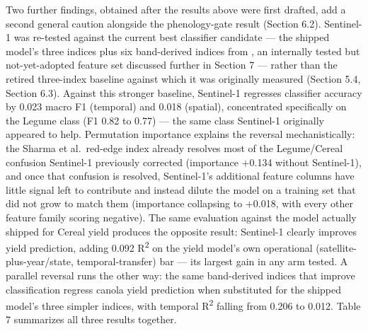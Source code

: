 Two further findings, obtained after the results above were first drafted, add a second general caution alongside the phenology-gate result (Section 6.2). Sentinel-1 was re-tested against the current best classifier candidate --- the shipped model's three indices plus six band-derived indices from \citet{sharma2026wa}, an internally tested but not-yet-adopted feature set discussed further in Section 7 --- rather than the retired three-index baseline against which it was originally measured (Section 5.4, Section 6.3). Against this stronger baseline, Sentinel-1 regresses classifier accuracy by 0.023 macro F1 (temporal) and 0.018 (spatial), concentrated specifically on the Legume class (F1 0.82 to 0.77) --- the same class Sentinel-1 originally appeared to help. Permutation importance explains the reversal mechanistically: the Sharma et al.~red-edge index already resolves most of the Legume/Cereal confusion Sentinel-1 previously corrected (importance +0.134 without Sentinel-1), and once that confusion is resolved, Sentinel-1's additional feature columns have little signal left to contribute and instead dilute the model on a training set that did not grow to match them (importance collapsing to +0.018, with every other feature family scoring negative). The same evaluation against the model actually shipped for Cereal yield produces the opposite result: Sentinel-1 clearly improves yield prediction, adding 0.092 R\textsuperscript{2} on the yield model's own operational (satellite-plus-year/state, temporal-transfer) bar --- its largest gain in any arm tested. A parallel reversal runs the other way: the same band-derived indices that improve classification regress canola yield prediction when substituted for the shipped model's three simpler indices, with temporal R\textsuperscript{2} falling from 0.206 to 0.012. Table 7 summarizes all three results together.

